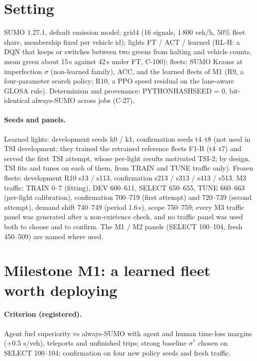 \documentclass[11pt]{article}
\begin{document}
\section{Setting}
SUMO 1.27.1, default emission model; grid4 (16 signals, 1\,800 veh/h, 50\% fleet share, membership fixed per vehicle id); lights FT / ACT / learned (RL-H: a DQN that
keeps or switches between two greens from halting and vehicle counts, mean green about 15\,s against 42\,s under FT, C-100); fleets: SUMO Krauss at
imperfection $\sigma$ (non-learned family), ACC, and the learned fleets of M1 (R9, a four-parameter search policy; R10, a PPO speed
residual on the lane-aware GLOSA rule). Determinism and provenance: PYTHONHASHSEED = 0, bit-identical always-SUMO across jobs (C-27).
\paragraph{Seeds and panels.} Learned lights: development seeds k0 / k1, confirmation seeds t4--t8 (not used in TSI development; they trained the retrained
reference fleets F1-B (t4--t7) and served the first TSI attempt, whose per-light results motivated TSI-2; by design, TSI fits and tunes on
each of them, from TRAIN and TUNE traffic only).
Frozen fleets: development R10 s13 / s113, confirmation s213 / s313 / s413 / s513. M3 traffic: TRAIN 0--7 (fitting), DEV 600--611,
SELECT 650--655, TUNE 660--663 (per-light calibration), confirmation 700--719 (first attempt) and 720--739 (second attempt), demand shift
740--749 (period 1.6\,s), scope 750--759; every M3 traffic panel was generated after a non-existence check, and no traffic panel was used both
to choose and to confirm. The M1 / M2 panels (SELECT 100--104, fresh 450--509) are named where used.

\section{Milestone M1: a learned fleet worth deploying}
\paragraph{Criterion (registered).} Agent fuel superiority vs always-SUMO with agent and human time-loss margins (+0.5 s/veh),
teleports and unfinished trips; strong baseline $\sigma^*$ chosen on SELECT 100--104; confirmation on four new policy seeds and fresh traffic.
\end{document}
